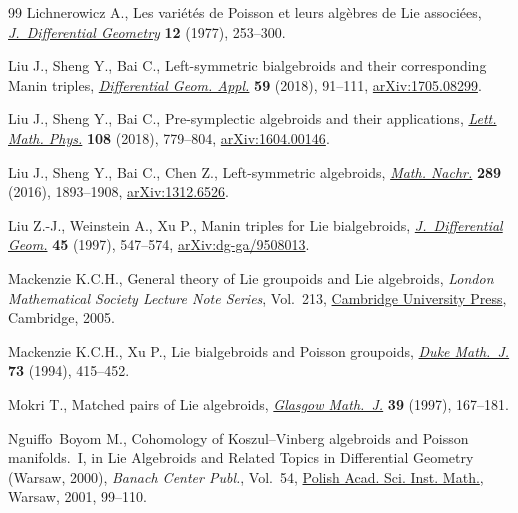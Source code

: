 \documentclass[pdftex]{sigma}%
\numberwithin{equation}{section}
\begin{document}
\begin{thebibliography}{99}
Lichnerowicz A., Les vari\'et\'es de {P}oisson et leurs alg\`ebres de {L}ie
 associ\'ees, \href{https://doi.org/10.4310/jdg/1214433987}{\textit{J.~Differential Geometry}} \textbf{12} (1977), 253--300.

Liu J., Sheng Y., Bai C., Left-symmetric bialgebroids and their corresponding
 {M}anin triples, \href{https://doi.org/10.1016/j.difgeo.2018.04.003}{\textit{Differential Geom. Appl.}} \textbf{59} (2018),
 91--111, \href{https://arxiv.org/abs/1705.08299}{arXiv:1705.08299}.

Liu J., Sheng Y., Bai C., Pre-symplectic algebroids and their applications,
 \href{https://doi.org/10.1007/s11005-017-0973-8}{\textit{Lett. Math. Phys.}} \textbf{108} (2018), 779--804,
 \href{https://arxiv.org/abs/1604.00146}{arXiv:1604.00146}.

Liu J., Sheng Y., Bai C., Chen Z., Left-symmetric algebroids, \href{https://doi.org/10.1002/mana.201300339}{\textit{Math.
 Nachr.}} \textbf{289} (2016), 1893--1908, \href{https://arxiv.org/abs/1312.6526}{arXiv:1312.6526}.

Liu Z.-J., Weinstein A., Xu P., Manin triples for {L}ie bialgebroids,
 \href{https://doi.org/10.4310/jdg/1214459842}{\textit{J.~Differential Geom.}} \textbf{45} (1997), 547--574,
 \href{https://arxiv.org/abs/dg-ga/9508013}{arXiv:dg-ga/9508013}.

Mackenzie K.C.H., General theory of {L}ie groupoids and {L}ie algebroids,
 \textit{London Mathematical Society Lecture Note Series}, Vol.~213, \href{https://doi.org/10.1017/CBO9781107325883}{Cambridge
 University Press}, Cambridge, 2005.

Mackenzie K.C.H., Xu P., Lie bialgebroids and {P}oisson groupoids, \href{https://doi.org/10.1215/S0012-7094-94-07318-3}{\textit{Duke
 Math.~J.}} \textbf{73} (1994), 415--452.

Mokri T., Matched pairs of {L}ie algebroids, \href{https://doi.org/10.1017/S0017089500032055}{\textit{Glasgow Math.~J.}}
 \textbf{39} (1997), 167--181.

Nguiffo~Boyom M., Cohomology of {K}oszul--{V}inberg algebroids and {P}oisson
 manifolds.~{I}, in Lie Algebroids and Related Topics in Differential Geometry
 ({W}arsaw, 2000), \textit{Banach Center Publ.}, Vol.~54, \href{https://doi.org/10.4064/bc54-0-7}{Polish Acad. Sci.
 Inst. Math.}, Warsaw, 2001, 99--110.


\end{thebibliography}
\end{document}

